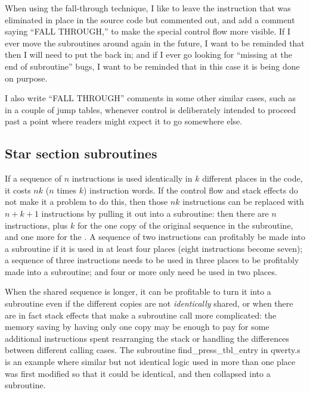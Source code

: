 When using the fall-through technique, I like to leave the 
instruction that was eliminated in place in the source code but commented
out, and add a comment saying ``FALL THROUGH,'' to make the special control
flow more visible.  If I ever move the subroutines around again in the
future, I want to be reminded that then I will need to put the 
back in; and if I ever go looking for ``missing  at the end of
subroutine'' bugs, I want to be reminded that in this case it is being done
on purpose.

I also write ``FALL THROUGH'' comments in some other similar cases, such as
in a couple of jump tables, whenever control is deliberately intended to
proceed past a point where readers might expect it to go somewhere else.

\subsection{Star section subroutines}

If a sequence of $n$ instructions is used identically in $k$ different
places in the code, it costs $nk$ ($n$ times $k$) instruction words.  If the
control flow and stack effects do not make it a problem to do this, then
those $nk$ instructions can be replaced with $n+k+1$ instructions by pulling
it out into a subroutine: then there are $n$  instructions, plus
$k$ for the one copy of the original sequence in the subroutine, and one
more for the .  A sequence of two instructions can profitably
be made into a subroutine if it is used in at least four places (eight
instructions become seven); a sequence of three instructions needs to be
used in three places to be profitably made into a subroutine; and four or
more only need be used in two places.

When the shared sequence is longer, it can be profitable to turn it into a
subroutine even if the different copies are not \emph{identically} shared,
or when there are in fact stack effects that make a subroutine call more
complicated: the memory saving by having only one copy may be enough to pay
for some additional instructions spent rearranging the stack or handling the
differences between different calling cases.  The subroutine
find\_press\_tbl\_entry in qwerty.s is an example where similar but not
identical logic used in more than one place was first modified so that it
could be identical, and then collapsed into a subroutine.

